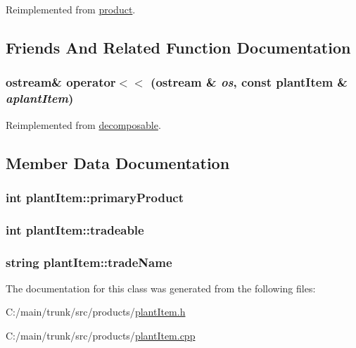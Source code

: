 Reimplemented from \hyperlink{classproduct_a1151ea416ab90047f8d087be57a6d7b1}{product}.

\subsection{Friends And Related Function Documentation}
\hypertarget{classplant_item_a57bdf6a52f37049686a779f3c93ecc73}{
\subsubsection[{operator$<$$<$}]{\setlength{\rightskip}{0pt plus 5cm}ostream\& operator$<$$<$ (ostream \& {\em os}, \/  const {\bf plantItem} \& {\em aplantItem})}}
\label{classplant_item_a57bdf6a52f37049686a779f3c93ecc73}


Reimplemented from \hyperlink{classdecomposable_a44e65cd8ff15e859dba4d1bfd1003c98}{decomposable}.

\subsection{Member Data Documentation}
\hypertarget{classplant_item_af54e9c26d0a6b3c7a4f899dd591634c0}{
\subsubsection[{primaryProduct}]{\setlength{\rightskip}{0pt plus 5cm}int {\bf plantItem::primaryProduct}}}
\label{classplant_item_af54e9c26d0a6b3c7a4f899dd591634c0}
\hypertarget{classplant_item_ad5daab88f181729c18eb9141d819ed69}{
\subsubsection[{tradeable}]{\setlength{\rightskip}{0pt plus 5cm}int {\bf plantItem::tradeable}}}
\label{classplant_item_ad5daab88f181729c18eb9141d819ed69}
\hypertarget{classplant_item_a8591ebca83e9a76f496ed8fdb70dd36c}{
\subsubsection[{tradeName}]{\setlength{\rightskip}{0pt plus 5cm}string {\bf plantItem::tradeName}}}
\label{classplant_item_a8591ebca83e9a76f496ed8fdb70dd36c}


The documentation for this class was generated from the following files:\begin{DoxyCompactItemize}
\item 
C:/main/trunk/src/products/\hyperlink{plant_item_8h}{plantItem.h}\item 
C:/main/trunk/src/products/\hyperlink{plant_item_8cpp}{plantItem.cpp}\end{DoxyCompactItemize}
